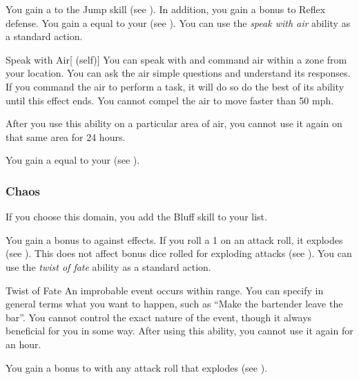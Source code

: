              You gain a   to the Jump skill (see ).
            In addition, you gain a  bonus to Reflex defense.
             You gain a  equal to your  (see ).
             You can use the \textit{speak with air} ability as a standard action.
            \begin{attuneability}{Speak with Air}[ (self)]
                You can speak with and command air within a \areahuge zone from your location.
                You can ask the air simple questions and understand its responses.
                If you command the air to perform a task, it will do so do the best of its ability until this effect ends.
                You cannot compel the air to move faster than 50 mph.

                After you use this ability on a particular area of air, you cannot use it again on that same area for 24 hours.
            \end{attuneability}
             You gain a  equal to your  (see ).

        \subsubsection{Chaos}
            If you choose this domain, you add the Bluff skill to your  list.

             You gain a  bonus to  against  effects.
             If you roll a 1 on an attack roll, it explodes (see ).
            This does not affect bonus dice rolled for exploding attacks (see ).
             You can use the \textit{twist of fate} ability as a standard action.
            \begin{apability}{Twist of Fate}
                An improbable event occurs within \rnglong range.
                You can specify in general terms what you want to happen, such as ``Make the bartender leave the bar''.
                You cannot control the exact nature of the event, though it always beneficial for you in some way.
                After using this ability, you cannot use it again for an hour.
            \end{apability}
             You gain a  bonus to  with any attack roll that explodes (see ).

